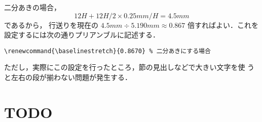 \documentclass[a4j, 12Q, twocolumn, twoside]{jsarticle}
\begin{document}
  二分あきの場合，
  \[ 12H + 12H/2 \times 0.25mm/H= 4.5mm\]であるから，
  行送りを現在の
  $4.5mm \div 5.190mm \approx 0.867$
  倍すればよい．これを設定するには次の通りプリアンブルに記述する．

{\small
\begin{verbatim}
\renewcommand{\baselinestretch}{0.8670} % 二分あきにする場合
\end{verbatim}
}

  ただし，実際にこの設定を行ったところ，節の見出しなどで大きい文字を使
  うと左右の段が揃わない問題が発生する．
\section{TODO}











\end{document}
